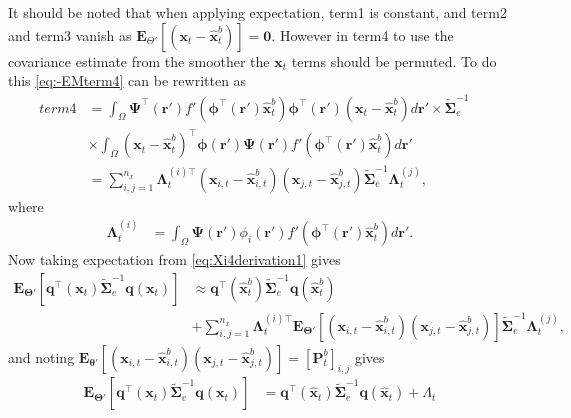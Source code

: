 \documentclass[]{article}
\begin{document}
It should be noted that when applying expectation, term1 is constant, and term2 and term3 vanish as $\mathbf E_{\Theta'}\left[(\mathbf x_t - \mathbf  {\hat x}_t^b)\right]= \mathbf 0$. However in term4 to use the covariance estimate from the smoother the $\mathbf{x}_t$ terms should be permuted. To do this \eqref{eq:-EMterm4} can be rewritten as 
\begin{align}
 term4 &= \int_\Omega \boldsymbol{\Psi}^\top(\mathbf{r}')f'(\boldsymbol \phi^\top(\mathbf r')\mathbf {\hat x}_t^b) \boldsymbol \phi^\top(\mathbf r')(\mathbf x_t - \mathbf  {\hat x}_t^b)d\mathbf{r}' \times \tilde{\boldsymbol\Sigma}_e^{-1} \nonumber \\
&\times\int_\Omega  (\mathbf x_t - \mathbf  {\hat x}_t^b)^\top\boldsymbol \phi(\mathbf r') \boldsymbol{\Psi}(\mathbf{r}')f'(\boldsymbol \phi^\top(\mathbf r')\mathbf {\hat x}_t^b) d\mathbf{r}'& \nonumber \\
&=\sum_{i,j=1}^{n_x}{\boldsymbol\Lambda}_t^{(i)\top}(\mathbf x_{i,t} - \mathbf  {\hat x}_{i,t}^b)(\mathbf x_{j,t} - \mathbf  {\hat x}_{j,t}^b)\tilde{\boldsymbol\Sigma}_e^{-1}{\boldsymbol\Lambda}_t^{(j)},
\end{align}
where
\begin{align}
	{\boldsymbol \Lambda}_t^{(i)}&=\int_{\Omega} \boldsymbol \Psi(\mathbf r')\phi_i(\mathbf r')f'(\boldsymbol\phi^\top(\mathbf r')\mathbf {\hat x}_t^b)d\mathbf r' \label{eq:lambdatildei}.
\end{align}
Now taking expectation from \eqref{eq:Xi4derivation1} gives
\begin{align}\label{eq:Xi4derivation2}
  \mathbf{E}_{\boldsymbol\Theta'}\left[ \mathbf q^\top(\mathbf x_t)\tilde{\boldsymbol\Sigma}_e^{-1}\mathbf q(\mathbf x_t)\right] &\approx \mathbf q^\top(\mathbf {\hat x}_t^b)\tilde{\boldsymbol\Sigma}_e^{-1}\mathbf q(\mathbf {\hat x}_t^b)\nonumber \\
&+\sum_{i,j=1}^{n_x}{\boldsymbol\Lambda}_t^{(i)\top}\mathbf{E}_{\boldsymbol\Theta'}\left[(\mathbf x_{i,t} - \mathbf  {\hat x}_{i,t}^b)(\mathbf x_{j,t} - \mathbf  {\hat x}_{j,t}^b)\right] \tilde{\boldsymbol\Sigma}_e^{-1}{\boldsymbol\Lambda}_t^{(j)},
\end{align}
and noting $\mathbf E_{\boldsymbol\theta'}\left[(\mathbf x_{i,t} - \mathbf  {\hat x}_{i,t}^b)(\mathbf x_{j,t} - \mathbf  {\hat x}_{j,t}^b) \right]=\left[\mathbf{P}_t^b\right]_{i,j} $ gives
\begin{align}
 \mathbf{E}_{\boldsymbol\Theta'}\left[ \mathbf q^\top(\mathbf x_t)\tilde{\boldsymbol\Sigma}_e^{-1}\mathbf q(\mathbf x_t)\right]&= \mathbf q^\top(\mathbf {\hat x}_t)\tilde{\boldsymbol\Sigma}_e^{-1}\mathbf q(\mathbf {\hat x}_t)+\boldsymbol\varLambda_t
\end{align}
\end{document}

